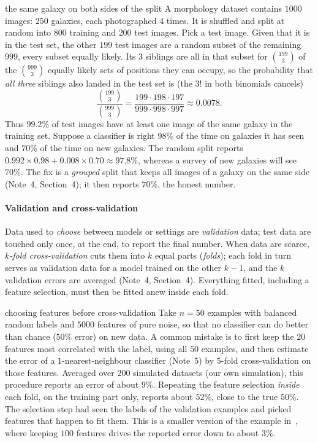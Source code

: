 \documentclass[11pt]{article}
\begin{document}
\begin{worked}{the same galaxy on both sides of the split}
A morphology dataset contains $1000$ images: $250$ galaxies, each photographed $4$ times. It is shuffled and split at
random into $800$ training and $200$ test images. Pick a test image. Given that it is in the test set, the other
$199$ test images are a random subset of the remaining $999$, every subset equally likely. Its $3$ siblings are all
in that subset for $\binom{199}{3}$ of the $\binom{999}{3}$ equally likely sets of positions they can occupy, so the
probability that \emph{all three} siblings also landed in the test set is (the $3!$ in both binomials cancels)
\[
  \frac{\binom{199}{3}}{\binom{999}{3}} = \frac{199 \cdot 198 \cdot 197}{999 \cdot 998 \cdot 997} \approx 0.0078 .
\]
Thus $99.2\%$ of test images have at least one image of the same galaxy in the training set. Suppose a classifier is
right $98\%$ of the time on galaxies it has seen and $70\%$ of the time on new galaxies. The random split reports
$0.992 \times 0.98 + 0.008 \times 0.70 \approx 97.8\%$, whereas a survey of new galaxies will see $70\%$. The fix is a
\emph{grouped} split that keeps all images of a galaxy on the same side (Note~4, Section~4); it then reports
$70\%$, the honest number.
\end{worked}

\paragraph{Validation and cross-validation} Data used to \emph{choose} between models or settings are
\emph{validation} data; test data are touched only once, at the end, to report the final number. When data are
scarce, \emph{$k$-fold cross-validation} cuts them into $k$ equal parts (\emph{folds}); each fold in turn serves as
validation data for a model trained on the other $k - 1$, and the $k$ validation errors are averaged (Note~4,
Section~4). Everything fitted, including a feature selection, must then be fitted anew inside each fold.

\begin{worked}{choosing features before cross-validation}
Take $n = 50$ examples with balanced random labels and $5000$ features of pure noise, so that no classifier can do better than chance ($50\%$
error) on new data. A common mistake is to first keep the $20$ features most correlated with the label, using all $50$
examples, and then estimate the error of a $1$-nearest-neighbour classifier (Note~5) by $5$-fold cross-validation on
those features. Averaged over $200$ simulated datasets (our own simulation), this procedure reports an error of
about $9\%$. Repeating the feature selection \emph{inside} each fold, on the training part only, reports about $52\%$,
close to the true $50\%$. The selection step had seen the labels of the validation examples and picked features that
happen to fit them. This is a smaller version of the example in~\cite[section~7.10.2]{hastie2009}, where keeping
$100$ features drives the reported error down to about $3\%$.
\end{worked}
\end{document}
